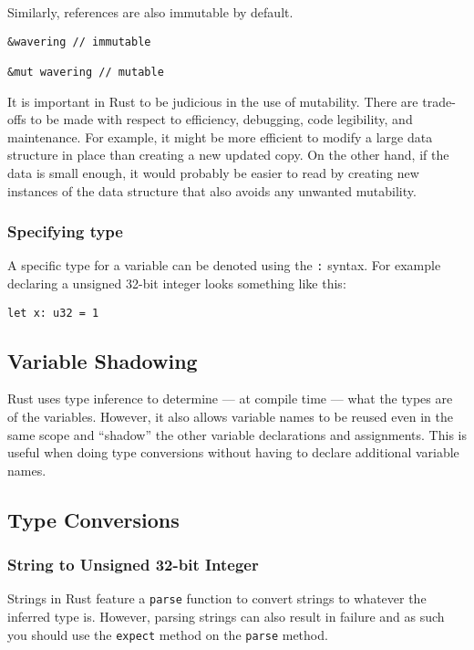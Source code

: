 \documentclass[12pt,notitlepage]{article}
\begin{document}
Similarly, references are also immutable by default.

\begin{lstlisting}
&wavering // immutable

&mut wavering // mutable
\end{lstlisting}

It is important in Rust to be judicious in the use of mutability. There are
trade-offs to be made with respect to efficiency, debugging, code legibility, and
maintenance. For example, it might be more efficient to modify a large data
structure in place than creating a new updated copy. On the other hand, if the
data is small enough, it would probably be easier to read by creating new
instances of the data structure that also avoids any unwanted mutability.

\subsubsection{Specifying type}

A specific type for a variable can be denoted using the \lstinline{:}
syntax. For example declaring a unsigned 32-bit integer looks something like
this:

\begin{lstlisting}
let x: u32 = 1
\end{lstlisting}




\subsection{Variable Shadowing}

Rust uses type inference to determine --- at compile time --- what the types
are of the variables. However, it also allows variable names to be reused even
in the same scope and ``shadow'' the other variable declarations and
assignments. This is useful when doing type conversions without having to
declare additional variable names.


\subsection{Type Conversions}

\subsubsection{String to Unsigned 32-bit Integer}

Strings in Rust feature a \lstinline{parse} function to convert strings to
whatever the inferred type is. However, parsing strings can also result in
failure and as such you should use the \lstinline{expect} method on the
\lstinline{parse} method.
\end{document}
